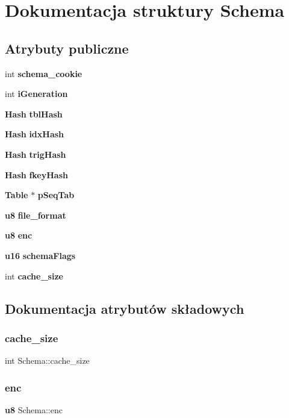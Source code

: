 \section{Dokumentacja struktury Schema}
\label{struct_schema}
\subsection*{Atrybuty publiczne}
\begin{DoxyCompactItemize}
\item 
int \textbf{ schema\+\_\+cookie}
\item 
int \textbf{ i\+Generation}
\item 
\textbf{ Hash} \textbf{ tbl\+Hash}
\item 
\textbf{ Hash} \textbf{ idx\+Hash}
\item 
\textbf{ Hash} \textbf{ trig\+Hash}
\item 
\textbf{ Hash} \textbf{ fkey\+Hash}
\item 
\textbf{ Table} $\ast$ \textbf{ p\+Seq\+Tab}
\item 
\textbf{ u8} \textbf{ file\+\_\+format}
\item 
\textbf{ u8} \textbf{ enc}
\item 
\textbf{ u16} \textbf{ schema\+Flags}
\item 
int \textbf{ cache\+\_\+size}
\end{DoxyCompactItemize}


\subsection{Dokumentacja atrybutów składowych}
\mbox{\label{struct_schema_a0a66691be95a30c099ca4840da7110dd}} 
\subsubsection{cache\_size}
{\footnotesize\ttfamily int Schema\+::cache\+\_\+size}

\mbox{\label{struct_schema_a1338d09fe9cbb5a8162929202cb73cae}} 
\subsubsection{enc}
{\footnotesize\ttfamily \textbf{ u8} Schema\+::enc}

\mbox{\label{struct_schema_ab9f0371436e41b3080772995407a4cca}} 
